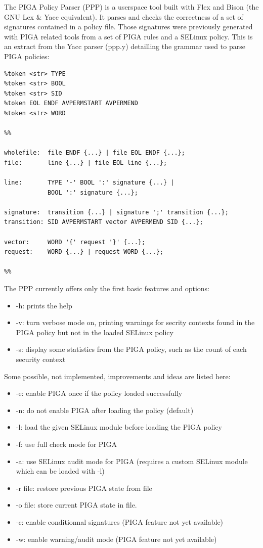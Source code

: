 \documentclass[pdftex,a4paper,titlepage,11pt]{article}
\begin{document}
The PIGA Policy Parser (PPP) is a userspace tool built with Flex and Bison (the
GNU Lex \& Yacc equivalent). It parses and checks the correctness of a set of
signatures contained in a policy file. Those signatures were previously
generated with PIGA related tools from a set of PIGA rules and a SELinux policy.
This is an extract from the Yacc parser (ppp.y) detailling the grammar used to
parse PIGA policies:

\begin{lstlisting}
%token <str> TYPE
%token <str> BOOL
%token <str> SID
%token EOL ENDF AVPERMSTART AVPERMEND
%token <str> WORD

%%

wholefile:	file ENDF {...} | file EOL ENDF {...};
file:		line {...} | file EOL line {...};

line:		TYPE '-' BOOL ':' signature {...} |
			BOOL ':' signature {...};

signature:	transition {...} | signature ';' transition {...};
transition:	SID AVPERMSTART vector AVPERMEND SID {...};

vector:		WORD '{' request '}' {...};
request:	WORD {...} | request WORD {...};

%%
\end{lstlisting}

\medskip

The PPP currently offers only the first basic features and options:
\begin{itemize}
	\item -h: prints the help
	\item -v: turn verbose mode on, printing warnings for secrity contexts found
in the PIGA policy but not in the loaded SELinux policy
	\item -s: display some statistics from the PIGA policy, such as the count of
each security context
\end{itemize}

\smallskip

Some possible, not implemented, improvements and ideas are listed here:
\begin{itemize}
	\item -e: enable PIGA once if the policy loaded successfully
	\item -n: do not enable PIGA after loading the policy (default)
	\item -l: load the given SELinux module before loading the PIGA policy
	\item -f: use full check mode for PIGA
	\item -a: use SELinux audit mode for PIGA (requires a custom SELinux module
which can be loaded with -l)
	\item -r file: restore previous PIGA state from file
	\item -o file: store current PIGA state in file.
	\item -c: enable conditionnal signatures (PIGA feature not yet available)
	\item -w: enable warning/audit mode (PIGA feature not yet available)
\end{itemize}
\end{document}
